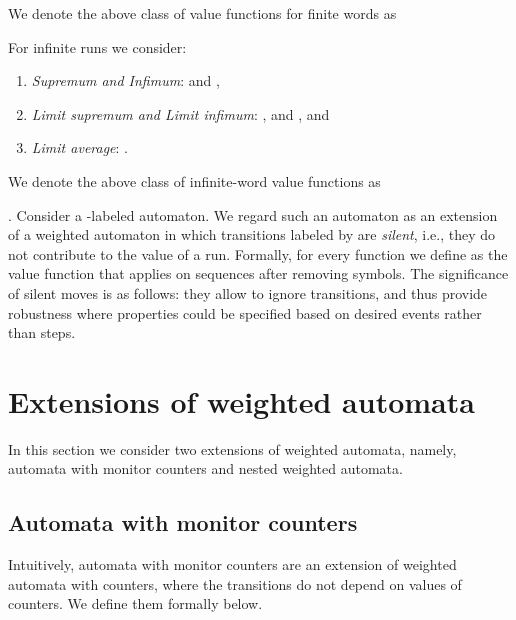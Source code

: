 \documentclass{lmcs}
\newcommand{\Paragraph}[1]{\noindent{\textbf{#1}}}
\newcommand{\aut}{\mathcal{A}}
\begin{document}
\noindent
We denote the above class of value functions for finite words as


\noindent
For infinite runs we consider:
\begin{enumerate}
\item \emph{Supremum and Infimum}:  and
 ,
 \item \emph{Limit supremum and Limit infimum}:
 , and
 , and
\item \emph{Limit average}: .
\end{enumerate}

\noindent
We denote the above class of infinite-word value functions as


\smallskip
\Paragraph{Silent moves}. Consider a -labeled automaton.
We regard such an automaton as an extension
of a weighted automaton in which transitions labeled by  are \emph{silent}, i.e., they do not contribute to
the value of a run. Formally, for every function  we define
 as the value function that applies  on sequences after removing  symbols.
The significance of silent moves is as follows: they allow to ignore transitions, and thus provide
robustness where properties could be specified based on desired events rather than steps.






\section{Extensions of weighted automata}
\newcommand{\autDiff}{\aut_{\textrm{diff}}}
In this section we consider two extensions of weighted automata,
namely, automata with monitor counters and nested weighted automata.


\subsection{Automata with monitor counters}
Intuitively, automata with monitor counters are an extension of weighted automata
with counters, where the transitions do not depend on values of counters.
We define them formally below.
\end{document}
